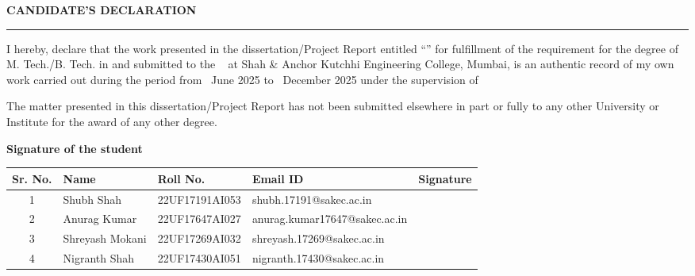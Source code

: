 \thispagestyle{empty}

\begin{center}
{\Large {\bf \uppercase{Candidate's Declaration}}}
\end{center}

\vspace{\baselineskip}
\hrule
\vspace{2\baselineskip}

I hereby, declare that the work presented in the dissertation/Project Report entitled {{“\mytitle”}} for fulfillment of the requirement for the degree of M. Tech./B. Tech. in \branch and submitted to the \mydep~ at Shah \& Anchor Kutchhi Engineering College, Mumbai, is an
authentic record of my own work carried out during the period from \ June 2025 to \ December 2025 under the supervision of {\mysupervisor} \par
\vspace{2\baselineskip}
The matter presented in this dissertation/Project Report has not been submitted elsewhere in part or fully to any other University or
Institute for the award of any other degree.


\bigskip


\bigskip


\bigskip

{\textbf{Signature of the student \ \ \ \ \ \ }}

  \begin{table}[htbp]
\centering\textbf{}
\begin{tabular}{|c|l|l|l|l|}
\hline
\textbf{Sr. No.} & \textbf{Name} & \textbf{Roll No.} & \textbf{Email ID}  &Signature\\ \hline
1 & Shubh Shah& 22UF17191AI053& shubh.17191@sakec.ac.in&\\ \hline
2 & Anurag Kumar& 22UF17647AI027& anurag.kumar17647@sakec.ac.in&\\ \hline
3 & Shreyash Mokani& 22UF17269AI032& shreyash.17269@sakec.ac.in&\\ \hline
4 & Nigranth Shah& 22UF17430AI051& nigranth.17430@sakec.ac.in&\\ \hline
\end{tabular}
\end{table}
